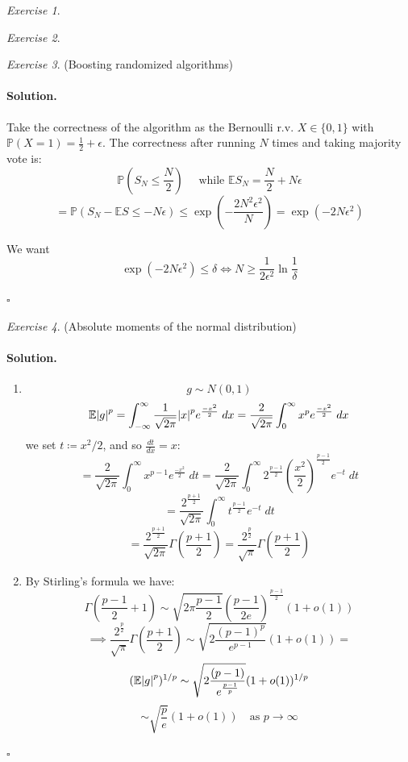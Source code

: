 \documentclass[11pt]{article}
\theoremstyle{definition}
\theoremstyle{remark}
\newtheorem{exercise}{Exercise}[section]
\newenvironment{solution}{\paragraph{Solution.}}{\hfill$\square$\medskip}
\newcommand{\E}{\mathbb{E}}
\newcommand{\Prob}{\mathbb{P}}
\newcommand{\1}{\mathbf{1}}
\begin{document}
\begin{exercise}
	
\end{exercise}

\begin{exercise}
	
\end{exercise}

\begin{exercise}
	(Boosting randomized algorithms)
\end{exercise}

\begin{solution}
	Take the correctness of the algorithm as the Bernoulli r.v. \(X \in \{0,1\}\) with \(\Prob(X=1)=\frac{1}{2} + \epsilon\). The correctness after running \(N\) times and taking majority vote is:
	\[
	\Prob(S_N \leq \frac{N}{2}) 
	\quad \text{ while } \E S_N = \frac{N}{2} + N\epsilon
	\]
	\[
	= \Prob(S_N - \E S \leq -N\epsilon ) \leq \exp( - \frac{2 N^2 \epsilon^2 }{ N } ) = \exp( - 2N\epsilon^2 )
	\]
	
	We want 
	\[
	\exp( - 2N\epsilon^2 ) \leq \delta \iff N \geq \frac{1}{2\epsilon^2} \ln \frac{1}{\delta}  
	\]
 	
 	
\end{solution}

\begin{exercise}

(Absolute moments of the normal distribution)
	
\end{exercise}

\begin{solution}
	
	\begin{enumerate}
	\item 
	\[
	g \sim N(0,1)
	\]
	\[
	\E \abs{g}^p = \int_{-\infty}^\infty \frac{1}{\sqrt{2\pi}} \abs{x}^p e^{\frac{-x^2}{2}} \; dx = \frac{2}{\sqrt{2\pi}} \int_0^\infty x^p e^{\frac{-x^2}{2}}  \; dx
	\]
	we set \(t \coloneq x^2/2\), and so \( \frac{dt}{dx} = x \):
	\[
	= \frac{2}{\sqrt{2\pi}} \int_0^\infty x^{p-1} e^{\frac{-x^2}{2}}  \; dt =  \frac{2}{\sqrt{2\pi}} \int_0^\infty    2^{ \frac{p-1}{2}} ( \frac{x^2}{2} )^{\frac{p-1}{2}} e^{-t}  \; dt 
	\]
	\[
	=  \frac{2^{ \frac{p+1}{2}}}{\sqrt{2\pi}} \int_0^\infty t^{\frac{p-1}{2}} e^{-t}  \; dt 
	\]
	\[
	=  \frac{2^{ \frac{p+1}{2}}}{\sqrt{2\pi}} \Gamma(\frac{p+1}{2}) =  \frac{2^{ \frac{p}{2}}}{\sqrt{\pi}} \Gamma(\frac{p+1}{2}) 
	\]
	\item By Stirling's formula we have:
	\[
	 \Gamma(\frac{p-1}{2} + 1) \sim \sqrt{2\pi \frac{p-1}{2} } ( \frac{p-1}{2e} )^{\frac{p-1}{2}} (1 + o(1))
	\]
	\[
	\implies \frac{2^{ \frac{p}{2}}}{\sqrt{\pi}} \Gamma(\frac{p+1}{2}) 
	\sim \sqrt{2 \frac{(p-1)^p}{e^{p-1}} }(1 + o(1))
	= 
	\]
	\[
	(\E \abs{g}^p)^{1/p} \sim \sqrt{2 \frac{(p-1)}{e^{\frac{p-1}{p}}} }(1 + o(1))^{1/p}
	\]
	\[
	 \sim  \sqrt{\frac{p}{e}}(1+o(1)) \quad \text{as } p \to \infty
	\]
	
	\end{enumerate}
	
\end{solution}
\end{document}

